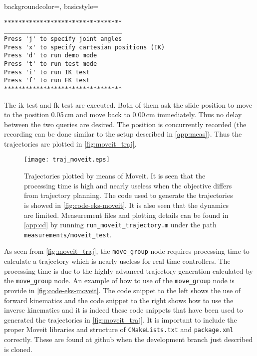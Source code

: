 {
    backgroundcolor=\color{white},
    basicstyle=\scriptsize\color{black}\ttfamily
}
\begin{lstlisting}[style=DOS]
*********************************
_________________________________
Press 'j' to specify joint angles
Press 'x' to specify cartesian positions (IK)
Press 'd' to run demo mode
Press 't' to run test mode
Press 'i' to run IK test 
Press 'f' to run FK test 
*********************************
\end{lstlisting}
The \gls{ik} test and \gls{fk} test are executed. Both of them ask the slide position to move to the position 0.05\,cm and move back to 0.00\,cm immediately. Thus no delay between the two queries are desired. The position is concurrently recorded (the recording can be done similar to the setup described in \autoref{app:meas}). Thus the trajectories are plotted in \autoref{fig:moveit_traj}.
\begin{figure}[H]
\centering
\texttt{[image: traj\_moveit.eps]}
	\caption{Trajectories plotted by means of Moveit. It is seen that the processing time is high and nearly useless when the objective differs from trajectory planning. The code used to generate the trajectories is showed in \autoref{fig:code-eks-moveit}. It is also seen that the dynamics are limited. Measurement files and plotting details can be found in \autoref{app:cd} by running \texttt{run\_moveit\_trajectory.m} under the path \texttt{measurements/moveit\_test}.}
	\label{fig:moveit_traj}
\end{figure}
As seen from \autoref{fig:moveit_traj}, the \texttt{move\_group} node requires processing time to calculate a trajectory which is nearly useless for real-time controllers. The processing time is due to the highly advanced trajectory generation calculated by the \texttt{move\_group} node. An example of how to use of the \texttt{move\_group} node is provide in \autoref{fig:code-eks-moveit}. The code snippet to the left shows the use of forward kinematics and the code snippet to the right shows how to use the inverse kinematics and it is indeed these code snippets that have been used to generated the trajectories in \autoref{fig:moveit_traj}. It is important to include the proper Moveit libraries and structure of \texttt{CMakeLists.txt} and \texttt{package.xml} correctly. These are found at github when the development branch just described is cloned.
